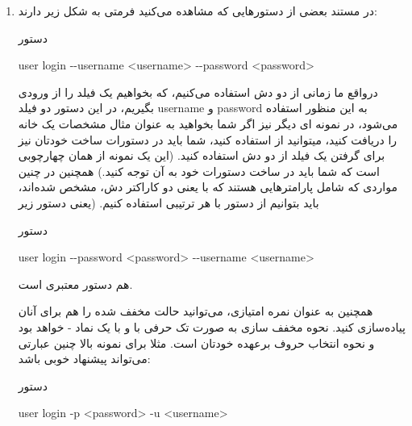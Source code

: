 \documentclass[]{article}
\begin{document}
\begin{enumerate}[label={نکته \arabic*:}]
\item
در مستند بعضی از دستور‌هایی که مشاهده می‌کنید فرمتی به شکل زیر دارند:

\begin{mybox}[colback=yellow]{دستور}
	
	
	\begin{latin}
		
	user login -{}-username <username> -{}-password <password>
		
	\end{latin}
	
\end{mybox}
درواقع ما زمانی از دو دش استفاده می‌کنیم، که بخواهیم یک فیلد را از ورودی بگیریم، در این دستور دو فیلد username و password به این منظور استفاده می‌شود، در نمونه ای دیگر نیز اگر شما بخواهید به عنوان مثال مشخصات یک خانه را دریافت کنید، میتوانید از  استفاده کنید، شما باید در دستورات ساخت خودتان نیز برای گرفتن یک فیلد از دو دش استفاده کنید. (این یک نمونه از همان چهارچوبی است که شما باید در ساخت دستورات خود به آن توجه کنید.)
همچنین در چنین مواردی که شامل پارامتر‌هایی هستند که با
\lr{-{}-}
یعنی دو کاراکتر دش، مشخص شده‌اند، باید بتوانیم از دستور با هر ترتیبی استفاده کنیم. (یعنی دستور زیر

\begin{mybox}[colback=yellow]{دستور}
	
	
	\begin{latin}
		
		user login -{}-password <password> -{}-username <username> 
		
	\end{latin}
	
\end{mybox}

هم دستور معتبری است.

همچنین به عنوان نمره امتیازی، می‌توانید حالت مخفف شده را هم برای آنان پیاده‌سازی کنید. نحوه مخفف سازی به صورت تک حرفی با و با یک نماد -
خواهد بود و نحوه انتخاب حروف برعهده خودتان است. مثلا برای نمونه بالا چنین عبارتی می‌تواند پیشنهاد خوبی باشد:

\begin{mybox}[colback=yellow]{دستور}
	
	
	\begin{latin}
		
		user login -p <password> -u <username> 
		
	\end{latin}
	
\end{mybox}


\end{enumerate}
\end{document}
